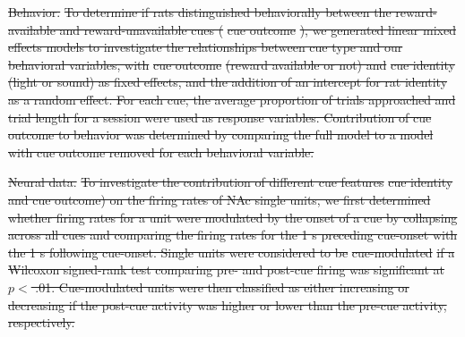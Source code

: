 \documentclass[11pt]{article}
\providecommand{\DIFdel}[1]{{\protect\color{red}\sout{#1}}}                      %
\begin{document}
\DIFdel{Behavior.}%
\DIFdel{To determine if rats distinguished behaviorally
between the reward-available and reward-unavailable cues (}%
\DIFdel{cue
outcome}%
\DIFdel{), we generated linear mixed effects models to investigate
the relationships between cue type and our behavioral variables, with
}%
\DIFdel{cue outcome}%
\DIFdel{(reward available or not) and }%
\DIFdel{cue identity}%
\DIFdel{(light or sound) as fixed effects, and the addition of an intercept
for rat identity as a random effect. For each cue, the average
proportion of trials approached and trial length for a session were
used as response variables. Contribution of cue outcome to behavior
was determined by comparing the full model to a model with cue outcome
removed for each behavioral variable.
}%

\DIFdel{Neural data.}%
\DIFdel{To investigate the contribution of different cue
features }%
\DIFdel{cue identity and cue outcome) on the firing rates of NAc
single units, we first determined whether firing rates for a unit
were modulated by the onset of a cue by collapsing across all cues
and comparing the firing rates for the 1 s preceding cue-onset with
the 1 s following cue-onset. Single units were considered to be }%
\DIFdel{cue-modulated}%
\DIFdel{if a Wilcoxon signed-rank test comparing pre- and
post-cue firing was significant at $p <$ .01. Cue-modulated units
were then classified as either increasing or decreasing if the
post-cue activity was higher or lower than the pre-cue activity,
respectively.
}%
\end{document}
